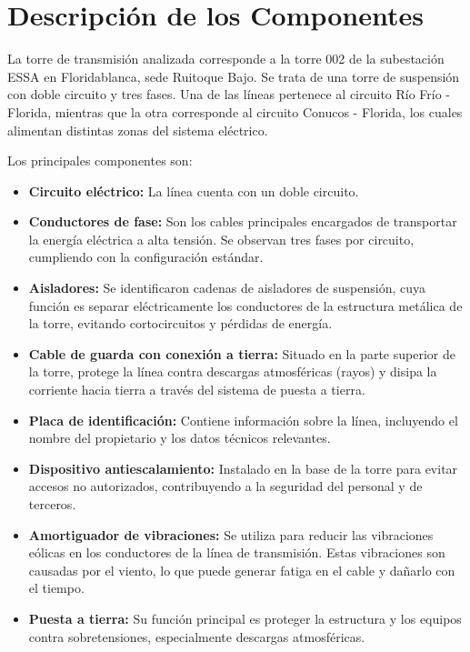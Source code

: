 \section{Descripción de los Componentes}

La torre de transmisión analizada corresponde a la torre 002 de la subestación ESSA en Floridablanca, sede Ruitoque Bajo. Se trata de una torre de suspensión con doble circuito y tres fases. Una de las líneas pertenece al circuito Río Frío - Florida, mientras que la otra corresponde al circuito Conucos - Florida, los cuales alimentan distintas zonas del sistema eléctrico.

Los principales componentes son:

\begin{itemize}
    \item \textbf{Circuito eléctrico:} La línea cuenta con un doble circuito.
    \item \textbf{Conductores de fase:} Son los cables principales encargados de transportar la energía eléctrica a alta tensión. Se observan tres fases por circuito, cumpliendo con la configuración estándar.
    \item \textbf{Aisladores:} Se identificaron cadenas de aisladores de suspensión, cuya función es separar eléctricamente los conductores de la estructura metálica de la torre, evitando cortocircuitos y pérdidas de energía.
    \item \textbf{Cable de guarda con conexión a tierra:} Situado en la parte superior de la torre, protege la línea contra descargas atmosféricas (rayos) y disipa la corriente hacia tierra a través del sistema de puesta a tierra.
    \item \textbf{Placa de identificación:} Contiene información sobre la línea, incluyendo el nombre del propietario y los datos técnicos relevantes.
    \item \textbf{Dispositivo antiescalamiento:} Instalado en la base de la torre para evitar accesos no autorizados, contribuyendo a la seguridad del personal y de terceros.
    \item \textbf{Amortiguador de vibraciones:} Se utiliza para reducir las vibraciones eólicas en los conductores de la línea de transmisión. Estas vibraciones son causadas por el viento, lo que puede generar fatiga en el cable y dañarlo con el tiempo.
    \item \textbf{Puesta a tierra:} Su función principal es proteger la estructura y los equipos contra sobretensiones, especialmente descargas atmosféricas.
\end{itemize}

